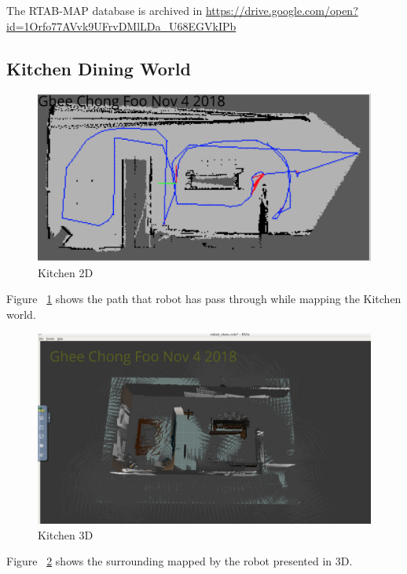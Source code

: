\documentclass[10pt,journal,compsoc]{IEEEtran}
\begin{document}
The RTAB-MAP database is archived in \url{https://drive.google.com/open?id=1Orfo77AVvk9UFrvDMlLDa_U68EGVkIPb}

\subsection{Kitchen Dining World}

\begin{figure}[thpb]
      \centering
      \includegraphics[width=\linewidth]{Kitchen_2D.png}
      \caption{Kitchen 2D}
      \label{fig:kitchen_2d}
\end{figure}

Figure ~\ref{fig:kitchen_2d} shows the path that robot has pass through while mapping the Kitchen world.

\begin{figure}[thpb]
      \centering
      \includegraphics[width=\linewidth]{Kitchen_World_3D.png}
      \caption{Kitchen 3D}
      \label{fig:kitchen_3d}
\end{figure}

Figure ~\ref{fig:kitchen_3d} shows the surrounding mapped by the robot presented in 3D.
\end{document}
